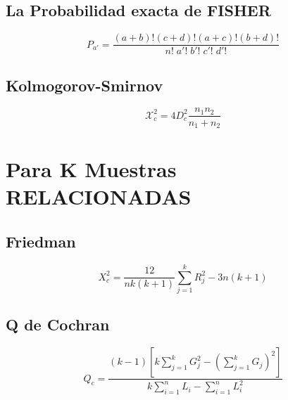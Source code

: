 \documentclass[12pt]{article}
\newcommand{\X}{\mathscr{X}}
\begin{document}
\subsection*{La Probabilidad exacta de FISHER}
\begin{center}
\begin{tcolorbox}[colback=white,colframe=black,width=8cm ,coltitle=white]
$$
P_{a'} =\frac{(a+b)!(c+d)!(a+c)!(b+d)!}{n!\; a'!\;b'!\;c'!\;d'!}
$$
\end{tcolorbox}
\end{center}


\subsection*{Kolmogorov-Smirnov}

\begin{center}
\begin{tcolorbox}[colback=white,colframe=black,width=6 cm]
\large{
$$\X^2_c = 4D^2_c\frac{n_1 n_2}{n_1 + n_2} $$}
\end{tcolorbox}
\end{center}



\newpage

\section*{Para K Muestras RELACIONADAS}
\subsection*{Friedman}
\begin{center}
\begin{tcolorbox}[colback=white,colframe=black,width=8cm ,coltitle=white]
$$
X^2_{c} =\frac{12}{nk(k+1)} \sum^{k}_{j=1} R^2_j - 3n(k+1)$$
\end{tcolorbox}
\end{center}

\subsection*{Q de Cochran}
\begin{center}
\begin{tcolorbox}[colback=white,colframe=black,width=10cm ,coltitle=white, valign = top] 
\begin{equation*}Q_{c} =\frac{ (k-1)\left[k\sum\limits^{k}_{j=1} G^2_j - \left(\sum\limits^{k}_{j=1} G_j \right)^2\right] }{k \sum\limits^{n}_{i=1} L_i - \sum\limits^{n}_{i=1} L_i^2} 
\end{equation*}
\end{tcolorbox}
\end{center}
\end{document}
